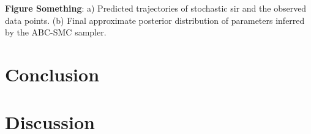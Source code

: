 \documentclass[12pt]{article} %
\begin{document}
\textbf{Figure Something}: a) Predicted trajectories of stochastic sir and the observed data points. (b) Final approximate posterior distribution of parameters inferred by the ABC-SMC sampler.




\section{Conclusion}
\section{Discussion}
\end{document}

